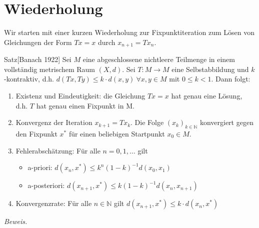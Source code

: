 \documentclass{article}
\begin{document}
\tableofcontents

\section{Wiederholung}
Wir starten mit einer kurzen Wiederholung zur Fixpunktiteration zum Lösen von Gleichungen 
der Form $Tx=x$ durch $x_{n+1}=Tx_n$.

\begin{thmbox}{Satz}[Banach 1922]
    Sei $M$ eine abgeschlossene nichtleere Teilmenge in einem vollständig metrischem Raum $(X,d)$. 
    Sei $T:M\rightarrow M$ eine Selbstabbildung und $k$-kontraktiv, d.h. $d(Tx,Ty)\leq k\cdot d(x,y)\ \forall x,y\in M$ 
    mit $0\leq k < 1$. Dann folgt:
    \begin{enumerate}
        \item Existenz und Eindeutigkeit: die Gleichung $Tx=x$ hat genau eine Lösung, d.h. $T$ hat genau einen 
        Fixpunkt in M.
        \item Konvergenz der Iteration $x_{k+1}=Tx_k$. Die Folge $(x_k)_{k\in\mathbb{N}}$ konvergiert gegen den 
        Fixpunkt $x^*$ für einen beliebigen Startpunkt $x_0\in M$.
        \item Fehlerabschätzung: Für alle $n=0,1,\dotsc$ gilt 
        \begin{itemize}
            \item a-priori: $d(x_n,x^*)\leq k^n(1-k)^{-1}d(x_0,x_1)$
            \item a-posteriori: $d(x_{n+1},x^*)\leq k(1-k)^{-1}d(x_n,x_{n+1})$
        \end{itemize}
        \item Konvergenzrate: Für alle $n\in\mathbb{N}$ gilt $d(x_{n+1},x^*)\leq k\cdot d(x_n,x^*)$
    \end{enumerate}
\end{thmbox}
\textit{Beweis.} 
\end{document}
